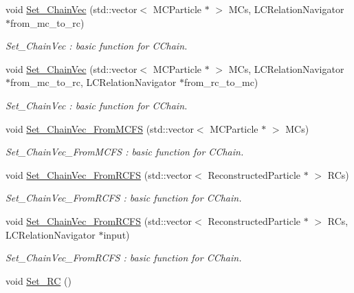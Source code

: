 \begin{DoxyCompactItemize}
void \hyperlink{classToolSet_1_1CChain__Vec_a30f79cdea8e84210e77e849722f59d2f}{Set\_\-ChainVec} (std::vector$<$ MCParticle $\ast$ $>$ MCs, LCRelationNavigator $\ast$from\_\-mc\_\-to\_\-rc)
\begin{DoxyCompactList}\small\item\em Set\_\-ChainVec : basic function for CChain. \item\end{DoxyCompactList}\item 
void \hyperlink{classToolSet_1_1CChain__Vec_ab517a961cbc4260575cd6531d26381fe}{Set\_\-ChainVec} (std::vector$<$ MCParticle $\ast$ $>$ MCs, LCRelationNavigator $\ast$from\_\-mc\_\-to\_\-rc, LCRelationNavigator $\ast$from\_\-rc\_\-to\_\-mc)
\begin{DoxyCompactList}\small\item\em Set\_\-ChainVec : basic function for CChain. \item\end{DoxyCompactList}\item 
void \hyperlink{classToolSet_1_1CChain__Vec_a941c5442fabf3407af54076e0d706887}{Set\_\-ChainVec\_\-FromMCFS} (std::vector$<$ MCParticle $\ast$ $>$ MCs)
\begin{DoxyCompactList}\small\item\em Set\_\-ChainVec\_\-FromMCFS : basic function for CChain. \item\end{DoxyCompactList}\item 
void \hyperlink{classToolSet_1_1CChain__Vec_a869d89522896a4eff5d7f129859aeeb3}{Set\_\-ChainVec\_\-FromRCFS} (std::vector$<$ ReconstructedParticle $\ast$ $>$ RCs)
\begin{DoxyCompactList}\small\item\em Set\_\-ChainVec\_\-FromRCFS : basic function for CChain. \item\end{DoxyCompactList}\item 
void \hyperlink{classToolSet_1_1CChain__Vec_a83e4a3636e16dd58daad83530da96eab}{Set\_\-ChainVec\_\-FromRCFS} (std::vector$<$ ReconstructedParticle $\ast$ $>$ RCs, LCRelationNavigator $\ast$input)
\begin{DoxyCompactList}\small\item\em Set\_\-ChainVec\_\-FromRCFS : basic function for CChain. \item\end{DoxyCompactList}\item 
\hypertarget{classToolSet_1_1CChain__Vec_acc86badcebf1e4026f3d4ae2e85bd5ad}{
void \hyperlink{classToolSet_1_1CChain__Vec_acc86badcebf1e4026f3d4ae2e85bd5ad}{Set\_\-RC} ()}
\label{classToolSet_1_1CChain__Vec_acc86badcebf1e4026f3d4ae2e85bd5ad}


\end{DoxyCompactItemize}

